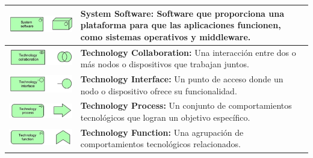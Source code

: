 \begin{longtable}{|c|p{8cm}|}
	\hline
	\includegraphics{anexos/ARCHI/technology/software.png}      &
	\textbf{System Software:} Software que proporciona una plataforma para que las aplicaciones funcionen, como sistemas operativos y middleware. \\
	\hline
	\includegraphics{anexos/ARCHI/technology/collaboration.png} &
	\textbf{Technology Collaboration:} Una interacción entre dos o más nodos o dispositivos que trabajan juntos.                                  \\
	\hline
	\includegraphics{anexos/ARCHI/technology/interface.png}     &
	\textbf{Technology Interface:} Un punto de acceso donde un nodo o dispositivo ofrece su funcionalidad.                                        \\
	\hline
	\includegraphics{anexos/ARCHI/technology/process.png}       &
	\textbf{Technology Process:} Un conjunto de comportamientos tecnológicos que logran un objetivo específico.                                   \\
	\hline
	\includegraphics{anexos/ARCHI/technology/function.png}      &
	\textbf{Technology Function:} Una agrupación de comportamientos tecnológicos relacionados.                                                    \\

\end{longtable}
